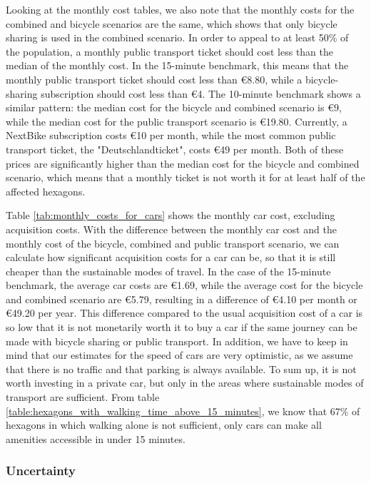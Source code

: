 Looking at the monthly cost tables, we also note that the monthly costs for the combined and bicycle scenarios are the same, which shows that only bicycle sharing is used in the combined scenario.
In order to appeal to at least 50\% of the population, a monthly public transport ticket should cost less than the median of the monthly cost.
In the 15-minute benchmark, this means that the monthly public transport ticket should cost less than \euro{8.80}, while a bicycle-sharing subscription should cost less than \euro{4}.
The 10-minute benchmark shows a similar pattern: the median cost for the bicycle and combined scenario is \euro{9}, while the median cost for the public transport scenario is \euro{19.80}.
Currently, a NextBike subscription costs \euro{10} per month, while the most common public transport ticket, the "Deutschlandticket", costs \euro{49} per month.
Both of these prices are significantly higher than the median cost for the bicycle and combined scenario, which means that a monthly ticket is not worth it for at least half of the affected hexagons.

Table \ref{tab:monthly_costs_for_cars} shows the monthly car cost, excluding acquisition costs.
With the difference between the monthly car cost and the monthly cost of the bicycle, combined and public transport scenario, we can calculate how significant acquisition costs for a car can be, so that it is still cheaper than the sustainable modes of travel.
In the case of the 15-minute benchmark, the average car costs are \euro{1.69}, while the average cost for the bicycle and combined scenario are \euro{5.79}, resulting in a difference of \euro{4.10} per month or \euro{49.20} per year.
This difference compared to the usual acquisition cost of a car is so low that it is not monetarily worth it to buy a car if the same journey can be made with bicycle sharing or public transport.
In addition, we have to keep in mind that our estimates for the speed of cars are very optimistic, as we assume that there is no traffic and that parking is always available.
To sum up, it is not worth investing in a private car, but only in the areas where sustainable modes of transport are sufficient.
From table \ref{table:hexagons_with_walking_time_above_15_minutes}, we know that 67\% of hexagons in which walking alone is not sufficient, only cars can make all amenities accessible in under 15 minutes.


\subsubsection{Uncertainty}

